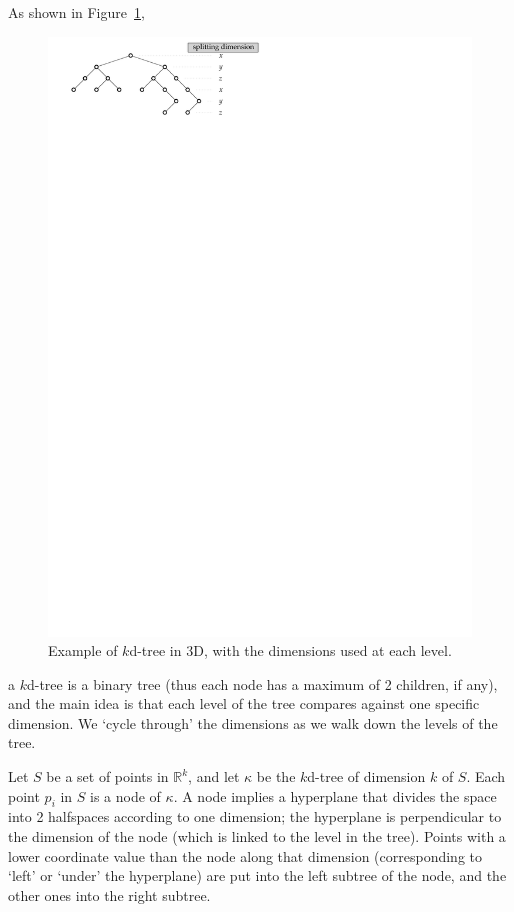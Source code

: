 %

As shown in Figure~\ref{fig:kdtree},
\begin{figure}
  \centering
  \includegraphics[width=0.5\linewidth]{figs/kdtree}
  \caption{Example of $k$d-tree in 3D, with the dimensions used at each level.}
\label{fig:kdtree}
\end{figure} 
a $k$d-tree is a binary tree (thus each node has a maximum of 2 children, if any), and the main idea is that each level of the tree compares against one specific dimension.
We `cycle through' the dimensions as we walk down the levels of the tree.

%

Let $S$ be a set of points in $\mathbb{R}^k$, and let $\kappa$ be the $k$d-tree of dimension $k$ of $S$.
Each point $p_i$ in $S$ is a node of $\kappa$.
A node implies a hyperplane that divides the space into 2 halfspaces according to one dimension; the hyperplane is perpendicular to the dimension of the node (which is linked to the level in the tree).
Points with a lower coordinate value than the node along that dimension (corresponding to `left' or `under' the hyperplane) are put into the left subtree of the node, and the other ones into the right subtree.

